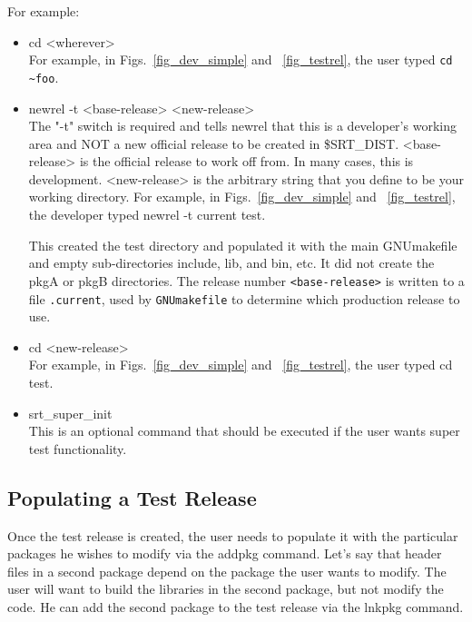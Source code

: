 \documentclass[12pt]{article}
\begin{document}
For example:
\begin{itemize}
\item {\ttfamily cd <wherever>}\\
      For example, in Figs.~\ref{fig_dev_simple} and ~\ref{fig_testrel},
the user typed {\ttfamily \verb|cd ~foo|}.
\item {\ttfamily newrel -t <base-release> <new-release>} \\
     The "-t" switch is required and tells newrel that this is a developer's
working area and NOT a new official release to be created in \$SRT\_DIST. 
<base-release> is the official release to work off from. In many cases,
this is development. <new-release> is the arbitrary string that you
define to be your working directory. 
For example, in Figs.~\ref{fig_dev_simple} and ~\ref{fig_testrel},
the developer typed {\ttfamily newrel -t current test}.

This created the {\ttfamily test} directory and populated it with the main 
GNUmakefile and empty sub-directories include, lib, and bin, etc.  
It did not
create the {\ttfamily pkgA} or {\ttfamily pkgB} directories.
The release number 
\texttt{<base-release>} is written to a file \texttt{.current}, used by 
\texttt{GNUmakefile} to determine which production release to use.
\item {\ttfamily cd <new-release>} \\
For example, in Figs.~\ref{fig_dev_simple} and ~\ref{fig_testrel},
the user typed {\ttfamily cd test}.
\item {\ttfamily srt\_super\_init } \\
	This is an optional command that should be executed if the user
wants super test functionality. 
\end{itemize}


\subsection{Populating a Test Release}
\label{sec_poprel}

Once the test release is created, the user needs to populate it 
with the particular packages he wishes to modify via the addpkg command. 
Let's say that header files in a second package depend on the package the
user wants to modify. The user will want to build the libraries in 
the second package, but not modify the code. He can add the second package
to the test release via the lnkpkg command. 
\end{document}
